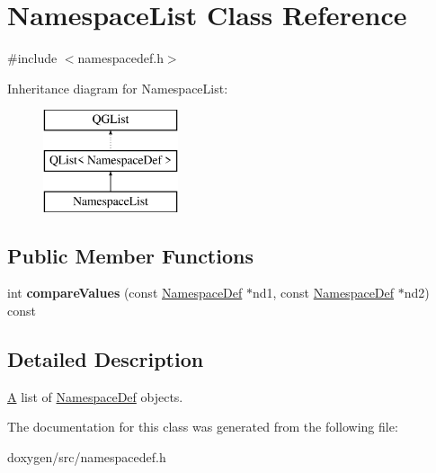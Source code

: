\hypertarget{class_namespace_list}{}\section{Namespace\+List Class Reference}
\label{class_namespace_list}


{\ttfamily \#include $<$namespacedef.\+h$>$}

Inheritance diagram for Namespace\+List\+:\begin{figure}[H]
\begin{center}
\leavevmode
\includegraphics[height=3.000000cm]{class_namespace_list}
\end{center}
\end{figure}
\subsection*{Public Member Functions}
\begin{DoxyCompactItemize}
\item 
\mbox{\label{class_namespace_list_a21aa3a7e986b9d7a609f814dd9149a6c}} 
int {\bfseries compare\+Values} (const \mbox{\hyperlink{class_namespace_def}{Namespace\+Def}} $\ast$nd1, const \mbox{\hyperlink{class_namespace_def}{Namespace\+Def}} $\ast$nd2) const
\end{DoxyCompactItemize}


\subsection{Detailed Description}
\mbox{\hyperlink{class_a}{A}} list of \mbox{\hyperlink{class_namespace_def}{Namespace\+Def}} objects. 

The documentation for this class was generated from the following file\+:\begin{DoxyCompactItemize}
\item 
doxygen/src/namespacedef.\+h\end{DoxyCompactItemize}
